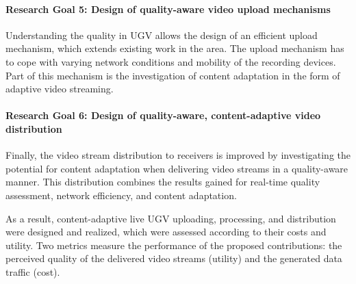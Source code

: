 \paragraph{Research Goal 5: Design of quality-aware video upload mechanisms} 
Understanding the quality in \ac{UGV} allows the design of an efficient upload mechanism, which extends existing work in the area.
The upload mechanism has to cope with varying network conditions and mobility of the recording devices.
Part of this mechanism is the investigation of content adaptation in the form of adaptive video streaming.
\paragraph{Research Goal 6: Design of quality-aware, content-adaptive video distribution}
Finally, the video stream distribution to receivers is improved by investigating the potential for content adaptation when delivering video streams in a quality-aware manner.
This distribution combines the results gained for real-time quality assessment, network efficiency, and content adaptation.

As a result, content-adaptive live \ac{UGV} uploading, processing, and distribution were designed and realized, which were assessed according to their costs and utility.
Two metrics measure the performance of the proposed contributions: the perceived quality of the delivered video streams (utility) and the generated data traffic (cost).
